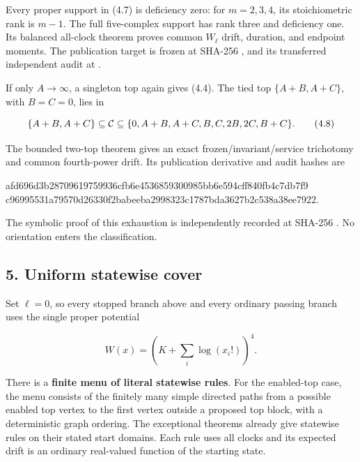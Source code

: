 Every proper support in (4.7) is deficiency zero: for \(m=2,3,4\), its
stoichiometric rank is \(m-1\). The full five-complex support has rank
three and deficiency one. Its balanced all-clock theorem proves common
\(W_\ell\) drift, duration, and endpoint moments. The publication target
is frozen at SHA-256
\texttt{},
and its transferred independent audit at
\texttt{}.

If only \(A\to\infty\), a singleton top again gives (4.4). The tied top
\(\{A+B,A+C\}\), with \(B=C=0\), lies in

\[
 \{A+B,A+C\}\subseteq{\cal C}
  \subseteq\{0,A+B,A+C,B,C,2B,2C,B+C\}.                   \tag{4.8}
\]

The bounded two-top theorem gives an exact frozen/invariant/service
trichotomy and common fourth-power drift. Its publication derivative and
audit hashes are

\begin{CodeBlock}
afd696d3b28709619759936cfb6e4536859300985bb6e594cff840fb4c7db7f9
c96995531a79570d26330f2babeeba2998323c1787bda3627b2c538a38ee7922.
\end{CodeBlock}

The symbolic proof of this exhaustion is independently recorded at
SHA-256
\texttt{}.
No orientation enters the classification.

\subsection{5. Uniform statewise cover}

Set \(\ell=0\), so every stopped branch above and every ordinary passing
branch uses the single proper potential

\[
     W(x)=\left(K+\sum_i\log(x_i!)\right)^4.                \tag{5.1}
\]

There is a \textbf{finite menu of literal statewise rules}. For the
enabled-top case, the menu consists of the finitely many simple directed
paths from a possible enabled top vertex to the first vertex outside a
proposed top block, with a deterministic graph ordering. The exceptional
theorems already give statewise rules on their stated start domains.
Each rule uses all clocks and its expected drift is an ordinary
real-valued function of the starting state.

